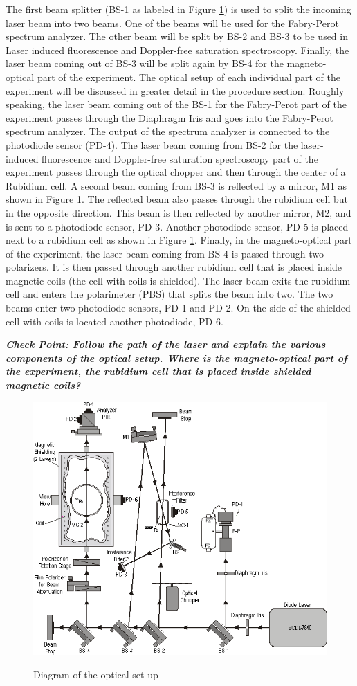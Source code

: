 \documentclass{../lab}
\begin{document}
The first beam splitter (BS-1 as labeled in Figure \ref{fig:DiagramOfOpticalSetup}) is used to split the incoming laser beam into two beams. One of the beams will be used for the Fabry-Perot spectrum analyzer. The other beam will be split by BS-2 and BS-3 to be used in Laser induced fluorescence and Doppler-free saturation spectroscopy. Finally, the laser beam coming out of BS-3 will be split again by BS-4 for the magneto-optical part of the experiment. The optical setup of each individual part of the experiment will be discussed in greater detail in the procedure section. Roughly speaking, the laser beam coming out of the BS-1 for the Fabry-Perot part of the experiment passes through the Diaphragm Iris and goes into the Fabry-Perot spectrum analyzer. The output of the spectrum analyzer is connected to the photodiode sensor (PD-4). The laser beam coming from BS-2 for the laser-induced fluorescence and Doppler-free saturation spectroscopy part of the experiment passes through the optical chopper and then through the center of a Rubidium cell. A second beam coming from BS-3 is reflected by a mirror, M1 as shown in Figure \ref{fig:DiagramOfOpticalSetup}. The reflected beam also passes through the rubidium cell but in the opposite direction. This beam is then reflected by another mirror, M2, and is sent to a photodiode sensor, PD-3. Another photodiode sensor, PD-5 is placed next to a rubidium cell as shown in Figure \ref{fig:DiagramOfOpticalSetup}. Finally, in the magneto-optical part of the experiment, the laser beam coming from BS-4 is passed through two polarizers. It is then passed through another rubidium cell that is placed inside magnetic coils (the cell with coils is shielded). The laser beam exits the rubidium cell and enters the polarimeter (PBS) that splits the beam into two. The two beams enter two photodiode sensors, PD-1 and PD-2. On the side of the shielded cell with coils is located another photodiode, PD-6.

\emph{\textbf{Check Point: Follow the path of the laser and explain the various components of the optical setup. Where is the magneto-optical part of the experiment, the rubidium cell that is placed inside shielded magnetic coils?}}

\begin{figure}[h]
    \centering
    \href{http://experimentationlab.berkeley.edu/sites/default/files/images/MNOimage003.gif}{\includegraphics[width=0.6\linewidth]{images/MNOimage003.png}}
    \caption{Diagram of the optical set-up}
    \label{fig:DiagramOfOpticalSetup}
\end{figure}
\end{document}

